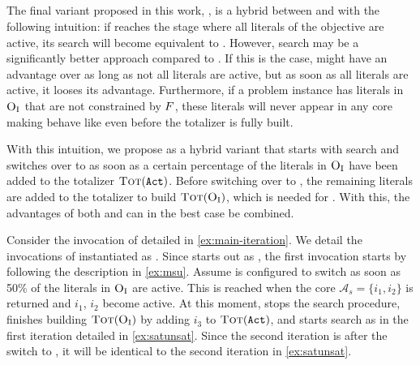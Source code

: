 \subsection{\msh{}\label{sec:hybrid}}

The final variant proposed in this work, \msh{}, is a hybrid between \msu{} and \satunsat{} with the following intuition:
if \msu{}  reaches the stage where all literals of the objective are active, its search will become equivalent to \unsatsat{}.
However, \satunsat{} search may be a significantly better approach compared to \unsatsat{}.
If this is the case, \msu{} might have an advantage over \satunsat{} as long as not all literals are active, but as soon as all literals are active, it looses its advantage.
Furthermore, if a problem instance has literals in $\textsc{O}_{\text{I}}$ that are not constrained by $F$, these literals will never appear in any core making \msu{} behave like \unsatsat{} even before the totalizer is fully built.

With this intuition, we propose \msh{} as a hybrid variant that starts with \msu{} search and switches over to \satunsat{} as soon as a certain percentage of the literals in $\textsc{O}_{\text{I}}$ have been added to the totalizer $\textsc{Tot}(\texttt{Act})$.
Before switching over to \satunsat{}, the remaining literals are added to the totalizer to build $\textsc{Tot}(\textsc{O}_{\text{I}})$, which is needed for \satunsat{}.
With this, the advantages of both \msu{} and \satunsat{} can in the best case be combined.

\begin{example}
  Consider the invocation of \algname{} detailed in \cref{ex:main-iteration}.
  We detail the invocations of \Min{} instantiated as \msh{}.
  Since \msh{} starts out as \msu{}, the first invocation starts by following the description in \cref{ex:msu}.
  Assume \msh{} is configured to switch as soon as 50\% of the literals in $\textsc{O}_{\text{I}}$ are active.
  This is reached when the core $\mathcal{A}_s=\{i_1,i_2\}$ is returned and $i_1$, $i_2$ become active.
  At this moment, \msh{} stops the \msu{} search procedure, finishes building $\textsc{Tot}(\textsc{O}_{\text{I}})$ by adding $i_3$ to $\textsc{Tot}(\texttt{Act})$, and starts \satunsat{} search as in the first iteration detailed in \cref{ex:satunsat}.
  Since the second iteration is after the switch to \satunsat{}, it will be identical to the second iteration in \cref{ex:satunsat}.
\end{example}


